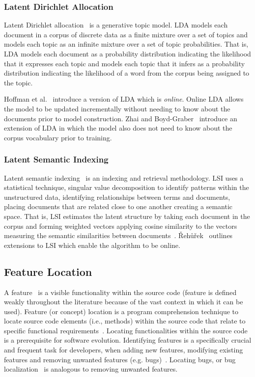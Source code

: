 \subsubsection{Latent Dirichlet Allocation}

Latent Dirichlet allocation~\cite{Blei-etal:2003} is a generative topic model.
LDA models each document in a corpus of discrete data as a finite mixture over
a set of topics and models each topic as an infinite mixture over a set of
topic probabilities.  That is, LDA models each document as a probability
distribution indicating the likelihood that it expresses each topic and models
each topic that it infers as a probability distribution indicating the
likelihood of a word from the corpus being assigned to the topic.

Hoffman et al.~\cite{Hoffman-etal:2010} introduce a version of LDA which is
\emph{online}.
Online LDA allows the model to be updated incrementally without needing
to know about the documents prior to model construction.
Zhai and Boyd-Graber~\cite{Zhai-Boyd-Graber:2013} introduce an extension of LDA
in which the model also does not need to know about the corpus vocabulary prior to training.

\subsubsection{Latent Semantic Indexing}

Latent semantic indexing~\cite{Deerwester-etal:1990} is an indexing and
retrieval methodology. LSI uses a statistical technique, singular value
decomposition to identify patterns within the unstructured data, identifying
relationships between terms and documents, placing documents that are related
close to one another creating a semantic space. That is, LSI estimates the
latent structure by taking each document in the corpus and forming weighted
vectors applying cosine similarity to the vectors measuring the semantic
similarities between documents~\cite{Binkley-Lawrie:2010}.
{\v R}eh{\r u}{\v r}ek~\cite{Radim:2011} outlines extensions to LSI
which enable the algorithm to be online.


\subsection{Feature Location}

A feature~\cite{Biggerstaff-etal:1993} is a visible functionality within the source code
(feature is defined weakly throughout the literature because of the vast
context in which it can be used). Feature (or concept) location is a program
comprehension technique to locate source code elements (i.e., methods)
within the source code that relate to specific functional
requirements~\cite{Eisenbarth-etal:2001, Biggers-etal:2014}. Locating functionalities
within the source code is a prerequisite for software evolution.  Identifying features is a specifically crucial and frequent task for
developers, when adding new features, modifying existing features and removing
unwanted features (e.g.  bugs)~\cite{Rajlich-Gosavi:2004, Dit-etal:2013b}. Locating bugs,
or bug localization~\cite{Lukins-etal:2008, Bassett-Kraft:2013} is analogous to removing unwanted features.

